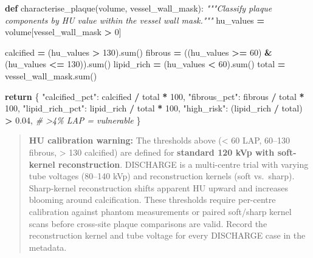 \documentclass[
  11pt,
]{article}
\newenvironment{Shaded}{\begin{snugshade}}{\end{snugshade}}
\newcommand{\BuiltInTok}[1]{#1}
\newcommand{\CommentTok}[1]{\textcolor[rgb]{0.56,0.35,0.01}{\textit{#1}}}
\newcommand{\ControlFlowTok}[1]{\textcolor[rgb]{0.13,0.29,0.53}{\textbf{#1}}}
\newcommand{\DecValTok}[1]{\textcolor[rgb]{0.00,0.00,0.81}{#1}}
\newcommand{\FloatTok}[1]{\textcolor[rgb]{0.00,0.00,0.81}{#1}}
\newcommand{\KeywordTok}[1]{\textcolor[rgb]{0.13,0.29,0.53}{\textbf{#1}}}
\newcommand{\NormalTok}[1]{#1}
\newcommand{\OperatorTok}[1]{\textcolor[rgb]{0.81,0.36,0.00}{\textbf{#1}}}
\newcommand{\StringTok}[1]{\textcolor[rgb]{0.31,0.60,0.02}{#1}}
\begin{document}
\begin{Shaded}
\begin{Highlighting}[]
\KeywordTok{def}\NormalTok{ characterise\_plaque(volume, vessel\_wall\_mask):}
    \CommentTok{"""Classify plaque components by HU value within the vessel wall mask."""}
\NormalTok{    hu\_values }\OperatorTok{=}\NormalTok{ volume[vessel\_wall\_mask }\OperatorTok{\textgreater{}} \DecValTok{0}\NormalTok{]}

\NormalTok{    calcified    }\OperatorTok{=}\NormalTok{ (hu\_values }\OperatorTok{\textgreater{}} \DecValTok{130}\NormalTok{).}\BuiltInTok{sum}\NormalTok{()}
\NormalTok{    fibrous      }\OperatorTok{=}\NormalTok{ ((hu\_values }\OperatorTok{\textgreater{}=} \DecValTok{60}\NormalTok{) }\OperatorTok{\&}\NormalTok{ (hu\_values }\OperatorTok{\textless{}=} \DecValTok{130}\NormalTok{)).}\BuiltInTok{sum}\NormalTok{()}
\NormalTok{    lipid\_rich   }\OperatorTok{=}\NormalTok{ (hu\_values }\OperatorTok{\textless{}} \DecValTok{60}\NormalTok{).}\BuiltInTok{sum}\NormalTok{()}
\NormalTok{    total        }\OperatorTok{=}\NormalTok{ vessel\_wall\_mask.}\BuiltInTok{sum}\NormalTok{()}

    \ControlFlowTok{return}\NormalTok{ \{}
        \StringTok{"calcified\_pct"}\NormalTok{: calcified }\OperatorTok{/}\NormalTok{ total }\OperatorTok{*} \DecValTok{100}\NormalTok{,}
        \StringTok{"fibrous\_pct"}\NormalTok{:   fibrous }\OperatorTok{/}\NormalTok{ total }\OperatorTok{*} \DecValTok{100}\NormalTok{,}
        \StringTok{"lipid\_rich\_pct"}\NormalTok{: lipid\_rich }\OperatorTok{/}\NormalTok{ total }\OperatorTok{*} \DecValTok{100}\NormalTok{,}
        \StringTok{"high\_risk"}\NormalTok{: (lipid\_rich }\OperatorTok{/}\NormalTok{ total) }\OperatorTok{\textgreater{}} \FloatTok{0.04}\NormalTok{,  }\CommentTok{\# \textgreater{}4\% LAP = vulnerable}
\NormalTok{    \}}
\end{Highlighting}
\end{Shaded}

\begin{quote}
\textbf{HU calibration warning:} The thresholds above (\textless{} 60
LAP, 60--130 fibrous, \textgreater{} 130 calcified) are defined for
\textbf{standard 120 kVp with soft-kernel reconstruction}. DISCHARGE is
a multi-centre trial with varying tube voltages (80--140 kVp) and
reconstruction kernels (soft vs.~sharp). Sharp-kernel reconstruction
shifts apparent HU upward and increases blooming around calcification.
These thresholds require per-centre calibration against phantom
measurements or paired soft/sharp kernel scans before cross-site plaque
comparisons are valid. Record the reconstruction kernel and tube voltage
for every DISCHARGE case in the metadata.
\end{quote}
\end{document}
